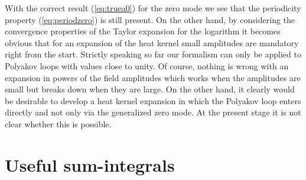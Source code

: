 \documentclass[a4paper,showpacs,showkeys,prd,nofootinbib]{revtex4}
\begin{document}
With the correct result (\ref{eq:truea0}) for the zero mode we see that the
periodicity property (\ref{eq:periodzero}) is still present. On the other hand,
by considering the convergence properties of the Taylor expansion for the logarithm 
it becomes obvious 
that for an expansion of the heat kernel small amplitudes are mandatory
right from the start. Strictly speaking so far our formalism can only be applied to
Polyakov loops with values close to unity. Of course, nothing is wrong with an
expansion in powers of the field amplitudes which works when the amplitudes are small
but breaks down when they are large. On the other hand, it clearly would be
desirable to develop a heat
kernel expansion in which the Polyakov loop enters directly and not only via the
generalized zero mode. At the present stage it is not clear whether this is possible.



\appendix

\section{Useful sum-integrals}
\label{sec:app}
\end{document}

